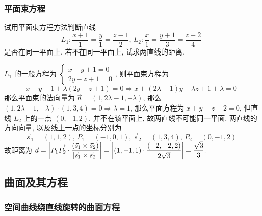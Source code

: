 \subsubsection{平面束方程}

\begin{example}
    试用平面束方程方法判断直线
    $$L_1:\dfrac{x+1}{1}=\dfrac{y}{1}=\dfrac{z-1}{2},~L_2:\dfrac{x}{1}=\dfrac{y+1}{3}=\dfrac{z-2}{4}$$
    是否在同一平面上, 若不在同一平面上, 试求两直线的距离.
\end{example}
\begin{solution}
    $L_1$ 的一般方程为 $\left\{\begin{matrix}
            x-y+1=0 \\
            2y-z+1=0
        \end{matrix}\right.$, 则平面束方程为 $$x-y+1+\lambda(2y-z+1)=0\Rightarrow x+(2\lambda-1)y-\lambda z+1+\lambda=0$$
    那么平面束的法向量为 $\vec{n}=(1,2\lambda-1,-\lambda)$, 那么 $(1,2\lambda-1,-\lambda)\cdot(1,3,4)=0\Rightarrow \lambda=1$,
    那么平面方程为 $x+y-z+2=0$, 但直线 $L_2$ 上的一点 $(0,-1,2)$, 并不在该平面上, 故两直线不可能同一平面, 两直线的方向向量, 以及线上一点的坐标分别为
    $$\vec{s}_1=(1,1,2),~P_1=(-1,0,1),~\vec{s}_2=(1,3,4),~P_2=(0,-1,2)$$
    故距离为 $d=\qty|\overrightarrow{P_1P_2}\cdot\dfrac{\qty(\vec{s}_1\times\vec{s}_2)}{\qty|\vec{s}_1\times\vec{s}_2|}|=\qty|(1,-1,1)\cdot\dfrac{(-2,-2,2)}{2\sqrt{3}}|=\dfrac{\sqrt{3}}{3}.$
\end{solution}

\subsection{曲面及其方程}

\subsubsection{空间曲线绕直线旋转的曲面方程}

